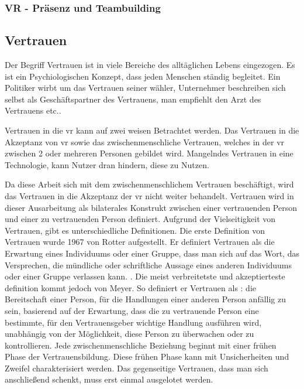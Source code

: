 \documentclass[a4paper,11pt]{article}%
\renewcommand{\\}{\vspace*{0.5\baselineskip} \newline}
\begin{document}
		\subsubsection{VR - Präsenz und Teambuilding}

\newpage

	\subsection{Vertrauen}
	
Der Begriff Vertrauen ist in viele Bereiche des alltäglichen Lebens eingezogen. Es ist ein Psychiologischen Konzept, dass jeden Menschen ständig begleitet.
Ein Politiker wirbt um das Vertrauen seiner wähler, Unternehmer beschreiben sich selbst als Geschäftspartner des Vertrauens, man empfiehlt den Arzt des Vertrauens etc..

Vertrauen in die \ac{vr} kann auf zwei weisen Betrachtet werden. Das Vertrauen in die Akzeptanz von \ac{vr} sowie das zwischenmenschliche Vertrauen, welches in der \ac{vr} zwischen 2 oder mehreren Personen gebildet wird.
Mangelndes Vertrauen in eine Technologie, kann Nutzer dran hindern, diese zu Nutzen. \citep{trustInVRTechnology}

Da diese Arbeit sich mit dem zwischenmenschlichem Vertrauen beschäftigt, wird das Vertrauen in die Akzeptanz der \ac{vr} nicht weiter behandelt.
Vertrauen wird in dieser Ausarbeitung als bilaterales Konstrukt zwischen einer vertrauenden Person und einer zu vertrauenden Person definiert.
Aufgrund der Vielseitigkeit von Vertrauen, gibt es unterschiedliche Definitionen. Die erste Definition von Vertrauen wurde 1967 von Rotter aufgestellt. Er definiert Vertrauen als \\ \dq die Erwartung eines Individuums oder einer Gruppe, dass man sich auf das Wort, das Versprechen, die mündliche oder schriftliche Aussage eines anderen Individuums oder einer Gruppe verlassen kann\dq{}. \citep[p.651]{rotter1967new}.\\
Die meist verbreitetste und akzeptierteste definition kommt jedoch von Meyer.\citep[p.712]{mayer1995integrative} So definiert er Vertrauen als : \\\dq die Bereitschaft einer Person, für die Handlungen einer anderen Person anfällig zu sein, basierend auf der Erwartung, dass die zu vertrauende Person eine bestimmte, für den Vertrauensgeber wichtige Handlung ausführen wird, unabhängig von der Möglichkeit, diese Person zu überwachen oder zu kontrollieren.\dq{}\\
Jede zwischenmenschliche Beziehung beginnt mit einer frühen Phase der Vertrauensbildung. Diese frühen Phase kann mit Unsicherheiten und Zweifel charakterisiert werden. Das gegenseitige Vertrauen, dass man sich anschließend schenkt, muss erst einmal ausgelotet werden. 
\end{document}

